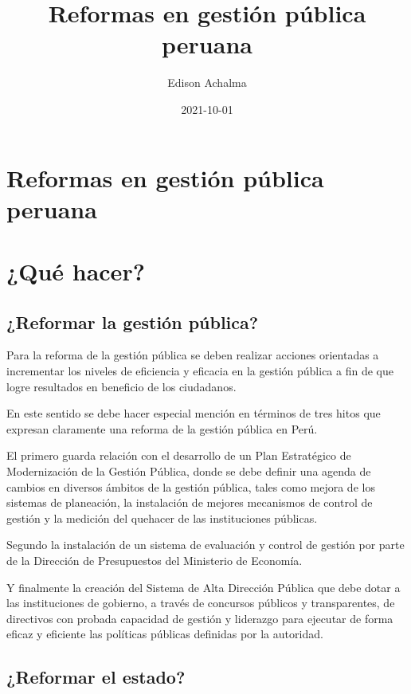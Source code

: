 \documentclass[
  jou,
  floatsintext,
  longtable,
  a4paper,
  nolmodern,
  notxfonts,
  notimes,
  12pt,
  colorlinks=true,linkcolor=blue,citecolor=blue,urlcolor=blue]{apa7}
\title{Reformas en gestión pública peruana}
\author{Edison Achalma}
\affiliation{
{Escuela Profesional de Economía, Universidad Nacional de San Cristóbal
de Huamanga}}
\date{2021-10-01}
\begin{document}
\maketitle


\hypertarget{toc}{}
\tableofcontents
\newpage
\section[Introduction]{Reformas en gestión pública peruana}

\setcounter{secnumdepth}{3}

\setlength\LTleft{0pt}




\section{¿Qué hacer?}\label{quuxe9-hacer}

\subsection{¿Reformar la gestión
pública?}\label{reformar-la-gestiuxf3n-puxfablica}

Para la reforma de la gestión pública se deben realizar acciones
orientadas a incrementar los niveles de eficiencia y eficacia en la
gestión pública a fin de que logre resultados en beneficio de los
ciudadanos.

En este sentido se debe hacer especial mención en términos de tres hitos
que expresan claramente una reforma de la gestión pública en Perú.

El primero guarda relación con el desarrollo de un Plan Estratégico de
Modernización de la Gestión Pública, donde se debe definir una agenda de
cambios en diversos ámbitos de la gestión pública, tales como mejora de
los sistemas de planeación, la instalación de mejores mecanismos de
control de gestión y la medición del quehacer de las instituciones
públicas.

Segundo la instalación de un sistema de evaluación y control de gestión
por parte de la Dirección de Presupuestos del Ministerio de Economía.

Y finalmente la creación del Sistema de Alta Dirección Pública que debe
dotar a las instituciones de gobierno, a través de concursos públicos y
transparentes, de directivos con probada capacidad de gestión y
liderazgo para ejecutar de forma eficaz y eficiente las políticas
públicas definidas por la autoridad.

\subsection{¿Reformar el estado?}\label{reformar-el-estado}
\end{document}
